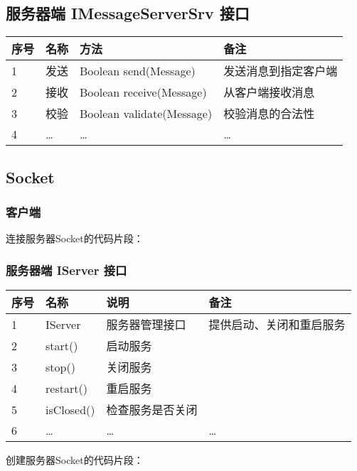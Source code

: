 \documentclass[a4paper]{ctexart}
\begin{document}
\subsection{服务器端 IMessageServerSrv 接口}
\begin{tabular}{llll}
    \toprule
    \textbf{序号} & \textbf{名称} & \textbf{方法}               & \textbf{备注} \\
    \midrule
    1           & 发送          & Boolean send(Message)     & 发送消息到指定客户端  \\
    2           & 接收          & Boolean receive(Message)  & 从客户端接收消息    \\
    3           & 校验          & Boolean validate(Message) & 校验消息的合法性    \\
    4           & …           & …                         & …           \\
    \bottomrule
\end{tabular}

\subsection{Socket}
\subsubsection{客户端}
连接服务器Socket的代码片段：
\begin{comment}
\begin{lstlisting}
// 连接服务器Socket
clientSocket = new Socket(SERVER_ADDRESS, SERVER_PORT);
\end{lstlisting}
\end{comment}
\subsubsection{服务器端 IServer 接口}
\begin{tabular}{llll}
    \toprule
    \textbf{序号} & \textbf{名称} & \textbf{说明} & \textbf{备注}  \\
    \midrule
    1           & IServer     & 服务器管理接口     & 提供启动、关闭和重启服务 \\
    2           & start()     & 启动服务        &              \\
    3           & stop()      & 关闭服务        &              \\
    4           & restart()   & 重启服务        &              \\
    5           & isClosed()  & 检查服务是否关闭    &              \\
    6           & …           & …           & …            \\
    \bottomrule
\end{tabular}
\vspace{1em}
创建服务器Socket的代码片段：
\begin{comment}
\begin{lstlisting}
// 创建服务器Socket
serverSocket = new ServerSocket(IConstant.SERVER_PORT);
\end{lstlisting}
\end{comment}
\end{document}
